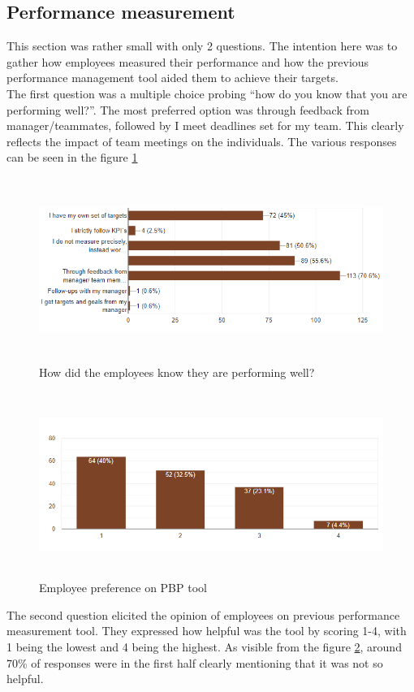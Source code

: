 \subsection{ Performance measurement}
This section was rather small with only 2 questions. The intention here was to gather how employees measured their performance and how the previous performance management tool aided them to achieve their targets.\\

The first question was a multiple choice probing “how do you know that you are performing well?”. The most preferred option was through feedback from manager/teammates, followed by I meet deadlines set for my team. This clearly reflects the impact of team meetings on the individuals. The various responses can be seen in the figure \ref{fig:5.11}
\begin{figure}[H]
    \centering
    \captionsetup{justification=centering, margin=2cm}
    \vspace{1cm}
    \includegraphics[width=15cm, height=6cm]{figure/auxiliary/fig511.PNG}
    \caption{How did the employees know they are performing well?}
    \label{fig:5.11}
\end{figure}

\begin{figure}[H]
    \centering
    \captionsetup{justification=centering, margin=2cm}
    \vspace{1cm}
    \includegraphics[width=15cm, height=6cm]{figure/auxiliary/fig512.PNG}
    \caption{Employee preference on PBP tool}
    \label{fig:5.12}
\end{figure}
The second question elicited the opinion of employees on previous performance measurement tool. They expressed how helpful was the tool by scoring 1-4, with 1 being the lowest and 4 being the highest. As visible from the figure \ref{fig:5.12}, around 70\% of responses were in the first half clearly mentioning that it was not so helpful.

